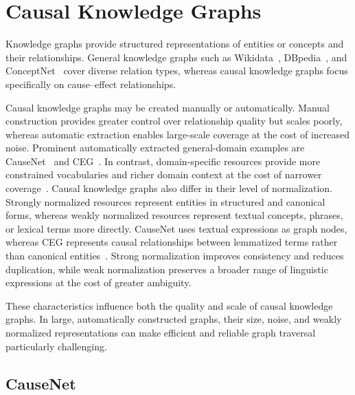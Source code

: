 \section{Causal Knowledge Graphs}
\label{sec:rw_causal_graphs}

Knowledge graphs provide structured representations of entities or concepts and their relationships. General knowledge graphs such as \mbox{Wikidata}~\cite{vrandecic:2014}, \mbox{DBpedia}~\cite{auer:2007}, and ConceptNet~\cite{speer:2017} cover diverse relation types, whereas causal knowledge graphs focus specifically on cause--effect relationships.

Causal knowledge graphs may be created manually or automatically. Manual construction provides greater control over relationship quality but scales poorly, whereas automatic extraction enables large-scale coverage at the cost of increased noise. Prominent automatically extracted general-domain examples are CauseNet~\cite{heindorf:2020} and CEG~\cite{li:2020}. In contrast, domain-specific resources provide more constrained vocabularies and richer domain context at the cost of narrower coverage~\cite{kilicoglu:2012,garg:2025}. Causal knowledge graphs also differ in their level of normalization. Strongly normalized resources represent entities in structured and canonical forms, whereas weakly normalized resources represent textual concepts, phrases, or lexical terms more directly. CauseNet uses textual expressions as graph nodes, whereas CEG represents causal relationships between lemmatized terms rather than canonical entities~\cite{heindorf:2020,li:2020}. Strong normalization improves consistency and reduces duplication, while weak normalization preserves a broader range of linguistic expressions at the cost of greater ambiguity.

These characteristics influence both the quality and scale of causal knowledge graphs. In large, automatically constructed graphs, their size, noise, and weakly normalized representations can make efficient and reliable graph traversal particularly challenging.

\subsection{CauseNet}
\label{sec:rw_causenet}

